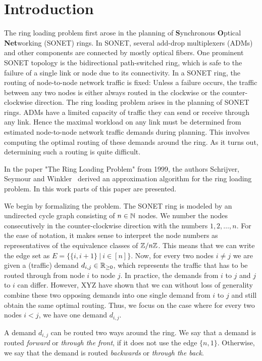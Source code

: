 \section{Introduction}

The ring loading problem first arose in the planning of \textbf{S}ynchronous \textbf{O}ptical \textbf{Net}working (SONET) rings.
In SONET, several add-drop multiplexers (ADMs) and other components are connected by mostly optical fibers.
One prominent SONET topology is the bidirectional path-switched ring, which is safe to the failure of a single link or node due to its connectivity.
In a SONET ring, the routing of node-to-node network traffic is fixed: Unless a failure occurs, the traffic between any two nodes is either always routed in the clockwise or the counter-clockwise direction.
The ring loading problem arises in the planning of SONET rings.
ADMs have a limited capacity of traffic they can send or receive through any link.
Hence the maximal workload on any link must be determined from estimated node-to-node network traffic demands during planning.
This involves computing the optimal routing of these demands around the ring.
As it turns out, determining such a routing is quite difficult.

In the paper "The Ring Loading Problem" from 1999, the authors Schrijver, Seymour and Winkler~\cite{schrijver99} derived an approximation algorithm for the ring loading problem.
In this work parts of this paper are presented.

We begin by formalizing the problem.
The SONET ring is modeled by an undirected cycle graph consisting of $n \in \mathbb{N}$ nodes.
We number the nodes consecutively in the counter-clockwise direction with the numbers $1, 2, \dots, n$.
For the ease of notation, it makes sense to interpret the node numbers as representatives of the equivalence classes of $\mathbb{Z}/n\mathbb{Z}$.
This means that we can write the edge set as $E = \{\{i, i+1\}\ |\ i \in [n]\}$.
Now, for every two nodes $i \neq j$ we are given a (traffic) demand $d_{i, j} \in \mathbb{R}_{\geq 0}$, which represents the traffic that has to be routed through from node $i$ to node $j$.
In practice, the demands from $i$ to $j$ and $j$ to $i$ can differ.
However, XYZ have shown that we can without loss of generality combine these two opposing demands into one single demand from $i$ to $j$ and still obtain the same optimal routing.
Thus, we focus on the case where for every two nodes $i < j$, we have one demand $d_{i,j}$.

A demand $d_{i, j}$ can be routed two ways around the ring.
We say that a demand is routed \emph{forward} or \emph{through the front}, if it does not use the edge $\{n, 1\}$.
Otherwise, we say that the demand is routed \emph{backwards} or \emph{through the back}.

